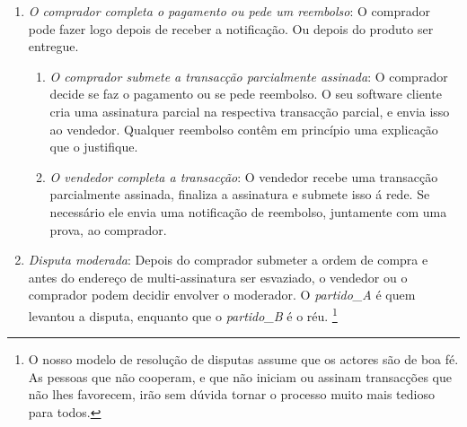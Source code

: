 \begin{enumerate}
\begin{enumerate}
\footnote{As transacções parciais podem conter uma série de valores pois estes involvem as mesmas entradas, e só uma delas é que no fim é assinada. Para ser modular e robusto pensa-se que é melhor lidar com elas separadamente.} 
Note that he reconstructs the multisig address out of the buyer-vendor-moderator base keys in combination with the buyer-moderator shared secret public key.
        \item {\em O vendedor envia o produto}: O vendedor envia o produto, e envia uma notificação ao comprador. Essa notificação contêm um recibo da compra, como também um requisito para que o utilizador complete o pagamento. Daqui em diante só se trata  da multi-assinatura 2-de-3.    
    \end{enumerate}{}
    \item {\em O comprador completa o pagamento ou pede um reembolso}: O comprador pode fazer logo depois de receber a notificação. Ou depois do produto ser entregue.
    \begin{enumerate}
        \item {\em O comprador submete a transacção parcialmente assinada}: O comprador decide se faz o pagamento ou se pede reembolso. O seu software cliente cria uma assinatura parcial na respectiva transacção parcial, e envia isso ao vendedor. Qualquer reembolso contêm em princípio uma explicação que o justifique.
        \item {\em O vendedor completa a transacção}: O vendedor recebe uma transacção parcialmente assinada, finaliza a assinatura e submete isso á rede. Se necessário ele envia uma notificação de reembolso, juntamente com uma prova, ao comprador. 
    \end{enumerate}{}
    \item {\em Disputa moderada}: Depois do comprador submeter a ordem de compra e antes do endereço de multi-assinatura ser esvaziado, o vendedor ou o comprador podem decidir envolver o moderador. O {\em partido\_A} é quem levantou a disputa, enquanto que o {\em partido\_B} é o réu. 
\footnote{O nosso modelo de resolução de disputas assume que os actores são de boa fé. As pessoas que não cooperam, e que não iniciam ou assinam transacções que não lhes favorecem, irão sem dúvida tornar o processo muito mais tedioso para todos.} 

\end{enumerate}
